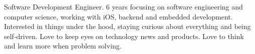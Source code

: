 

\begin{cvparagraph}

Software Development Engineer. 6 years focusing on software engineering and computer science, working with iOS, backend and embedded development. Interested in things under the hood, staying curious about everything and being self‐driven. Love to keep eyes on technology news and products. Love to think and learn more when problem solving.
\end{cvparagraph}
